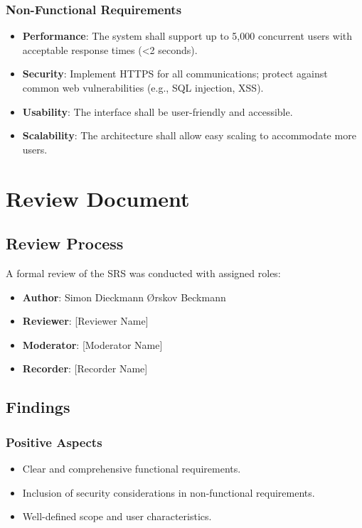 \documentclass[12pt,a4paper]{report}
\begin{document}
\subsection{Non-Functional Requirements}
\begin{itemize}
    \item \textbf{Performance}: The system shall support up to 5,000 concurrent users with acceptable response times (<2 seconds).
    \item \textbf{Security}: Implement HTTPS for all communications; protect against common web vulnerabilities (e.g., SQL injection, XSS).
    \item \textbf{Usability}: The interface shall be user-friendly and accessible.
    \item \textbf{Scalability}: The architecture shall allow easy scaling to accommodate more users.
\end{itemize}

\chapter{Review Document}
\section{Review Process}
A formal review of the SRS was conducted with assigned roles:

\begin{itemize}
    \item \textbf{Author}: Simon Dieckmann Ørskov Beckmann
    \item \textbf{Reviewer}: [Reviewer Name]
    \item \textbf{Moderator}: [Moderator Name]
    \item \textbf{Recorder}: [Recorder Name]
\end{itemize}

\section{Findings}
\subsection{Positive Aspects}
\begin{itemize}
    \item Clear and comprehensive functional requirements.
    \item Inclusion of security considerations in non-functional requirements.
    \item Well-defined scope and user characteristics.
\end{itemize}
\end{document}
